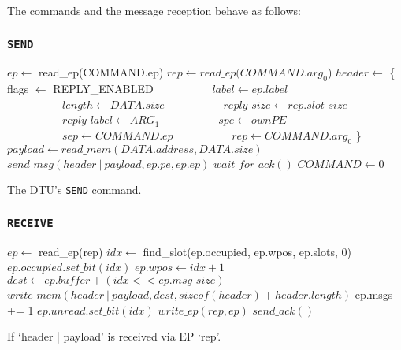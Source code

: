 \documentclass[a4paper,11pt,draft]{article}
\begin{document}
\noindent The commands and the message reception behave as follows:

\subsubsection{\texttt{SEND}}

\begin{algorithm}[H]
    $ep \gets$ read\_ep(COMMAND.ep)\;
    \BlankLine
    $rep \gets read\_ep(COMMAND.arg_0$)\;
    $header \gets$ \{ flags $\gets$ REPLY\_ENABLED\;
    $\quad\quad\quad\quad\quad label \gets ep.label$\;
    $\quad\quad\quad\quad\quad length \gets DATA.size$\;
    $\quad\quad\quad\quad\quad reply\_size \gets rep.slot\_size$\;
    $\quad\quad\quad\quad\quad reply\_label \gets ARG_1$\;
    $\quad\quad\quad\quad\quad spe \gets ownPE$\;
    $\quad\quad\quad\quad\quad sep \gets COMMAND.ep$\;
    $\quad\quad\quad\quad\quad rep \gets COMMAND.arg_0$ \}\;
    $payload \gets read\_mem(DATA.address, DATA.size)$\;
    $send\_msg(header\ |\ payload, ep.pe, ep.ep)$\;
    $wait\_for\_ack()$\;
    \BlankLine
    $COMMAND \gets 0$\;
    \caption{The DTU's \texttt{SEND} command.}
\end{algorithm}

\subsubsection{\texttt{RECEIVE}}

\begin{algorithm}[H]
    $ep \gets$ read\_ep(rep)\;
    \BlankLine
    $idx \gets$ find\_slot(ep.occupied, ep.wpos, ep.slots, 0)\;
    $ep.occupied.set\_bit(idx)$\;
    $ep.wpos \gets idx + 1$\;
    \BlankLine
    $dest \gets ep.buffer + (idx << ep.msg\_size)$\;
    $write\_mem(header\ |\ payload, dest, sizeof(header) + header.length)$\;
    ep.msgs += 1\;
    $ep.unread.set\_bit(idx)$\;
    $write\_ep(rep, ep)$\;
    \BlankLine
    \BlankLine
    $send\_ack()$\;
    \caption{If `header | payload' is received via EP `rep'.}
\end{algorithm}
\end{document}
